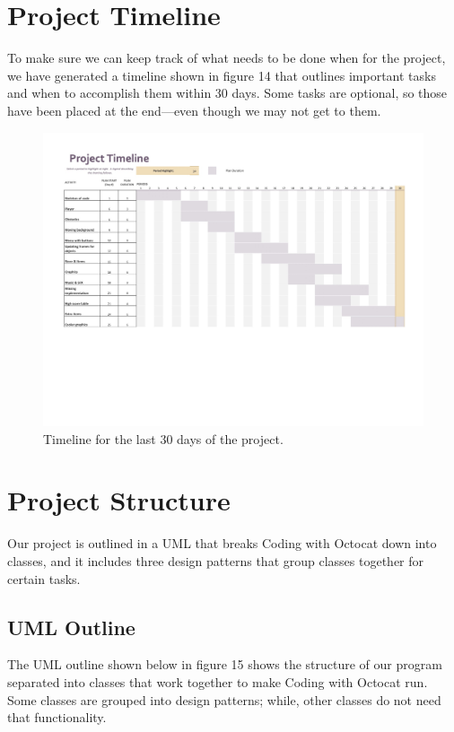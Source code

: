 \documentclass[10pt,conference,onecolumn,compsoc]{IEEEtran}
\begin{document}
\clearpage

\section{Project Timeline}
To make sure we can keep track of what needs to be done when for the project, we have generated a timeline shown in figure 14 that outlines important tasks and when to accomplish them within 30 days. Some tasks are optional, so those have been placed at the end—even though we may not get to them.

\begin{figure}[!ht]
\includegraphics[scale=.3]{Timeline.jpeg}
\caption{Timeline for the last 30 days of the project.}
\end{figure}

\section{Project Structure}
Our project is outlined in a UML that breaks Coding with Octocat down into classes, and it includes three design patterns that group classes together for certain tasks.

\subsection{UML Outline}
The UML outline shown below in figure 15 shows the structure of our program separated into classes that work together to make Coding with Octocat run. Some classes are grouped into design patterns; while, other classes do not need that functionality.
\end{document}
